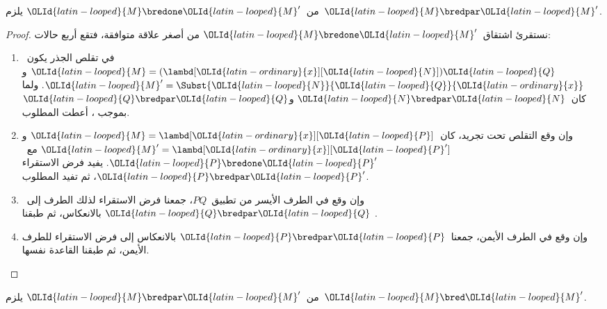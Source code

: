 \documentclass[../../../include/open-logic-section]{subfiles}
\begin{document}


\begin{lem}
  من~$\OLId{latin-looped}{M} \bredone \OLId{latin-looped}{M}'$ يلزم~$\OLId{latin-looped}{M} \bredpar \OLId{latin-looped}{M}'$.
\end{lem}
\begin{proof}
  نستقرئ اشتقاق~$\OLId{latin-looped}{M} \bredone \OLId{latin-looped}{M}'$ من أصغر علاقة متوافقة، فتقع أربع حالات:
  \begin{enumerate}
  \item في تقلص الجذر يكون~$\OLId{latin-looped}{M}=(\lambd[\OLId{latin-ordinary}{x}][\OLId{latin-looped}{N}])\OLId{latin-looped}{Q}$ و
    $\OLId{latin-looped}{M}'=\Subst{\OLId{latin-looped}{N}}{\OLId{latin-looped}{Q}}{\OLId{latin-ordinary}{x}}$. ولما كان~$\OLId{latin-looped}{N}\bredpar \OLId{latin-looped}{N}$ و$\OLId{latin-looped}{Q}\bredpar \OLId{latin-looped}{Q}$
    بموجب ، أعطت
     المطلوب.
  \item وإن وقع التقلص تحت تجريد، كان~$\OLId{latin-looped}{M}=\lambd[\OLId{latin-ordinary}{x}][\OLId{latin-looped}{P}]$ و
    $\OLId{latin-looped}{M}'=\lambd[\OLId{latin-ordinary}{x}][\OLId{latin-looped}{P}']$ مع~$\OLId{latin-looped}{P}\bredone \OLId{latin-looped}{P}'$. يفيد فرض الاستقراء
    $\OLId{latin-looped}{P}\bredpar \OLId{latin-looped}{P}'$، ثم تفيد  المطلوب.
  \item وإن وقع في الطرف الأيسر من تطبيق~$PQ$، جمعنا فرض
    الاستقراء لذلك الطرف إلى~$\OLId{latin-looped}{Q}\bredpar \OLId{latin-looped}{Q}$ بالانعكاس، ثم طبقنا
    .
  \item وإن وقع في الطرف الأيمن، جمعنا~$\OLId{latin-looped}{P}\bredpar \OLId{latin-looped}{P}$ بالانعكاس
    إلى فرض الاستقراء للطرف الأيمن، ثم طبقنا القاعدة نفسها.
  \end{enumerate}
\end{proof}

\begin{lem}
  من~$\OLId{latin-looped}{M} \bredpar \OLId{latin-looped}{M}'$ يلزم~$\OLId{latin-looped}{M} \bred \OLId{latin-looped}{M}'$.
\end{lem}
\end{document}
